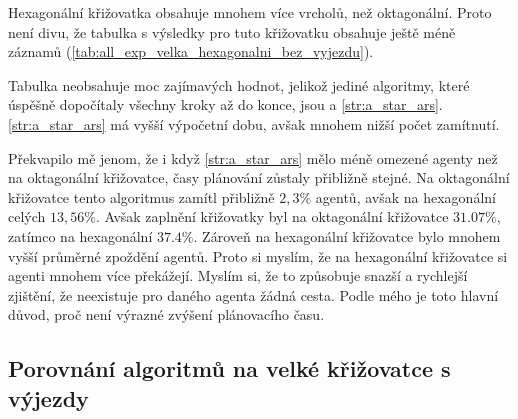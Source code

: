 Hexagonální křižovatka obsahuje mnohem více vrcholů, než oktagonální.
Proto není divu,
že tabulka s výsledky pro tuto křižovatku obsahuje ještě méně záznamů (\ref{tab:all_exp_velka_hexagonalni_bez_vyjezdu}).

Tabulka neobsahuje moc zajímavých hodnot, jelikož jediné algoritmy, které úspěšně dopočítaly všechny kroky až do konce,
jsou  a \ref{str:a_star_ars}.
\ref{str:a_star_ars} má vyšší výpočetní dobu, avšak mnohem nižší počet zamítnutí.

Překvapilo mě jenom, že i když \ref{str:a_star_ars} mělo méně omezené agenty než na oktagonální křižovatce,
časy plánování zůstaly přibližně stejné.
Na oktagonální křižovatce tento algoritmus zamítl přibližně $2,3\%$ agentů, avšak na hexagonální celých $13,56\%$.
Avšak zaplnění křižovatky byl na oktagonální křižovatce $31.07\%$, zatímco na hexagonální $37.4\%$.
Zároveň na hexagonální křižovatce bylo mnohem vyšší průměrné zpoždění agentů.
Proto si myslím, že na hexagonální křižovatce si agenti mnohem více překážejí.
Myslím si, že to způsobuje snazší a rychlejší zjištění, že neexistuje pro daného agenta žádná cesta.
Podle mého je toto hlavní důvod, proč není výrazné zvýšení plánovacího času.



\subsection{Porovnání algoritmů na velké křižovatce s výjezdy}
\label{subsec:porovnani_algoritmu_na_velke_krizovatce_s_vyjezdy}






